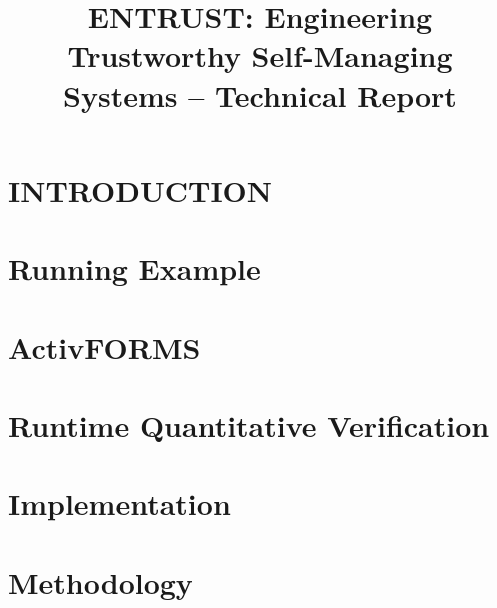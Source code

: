 \documentclass[a4paper]{llncs}
\newcommand{\approach}{ENTRUST}
\begin{document}
\title{\approach: Engineering Trustworthy Self-Managing Systems -- Technical Report}
\author{}
\institute{}
\maketitle


\section{INTRODUCTION} \label{sec:introduction}


\section{Running Example}


\section{ActivFORMS}


\section{Runtime Quantitative Verification}


\section{Implementation}


\section{Methodology}




\end{document}
